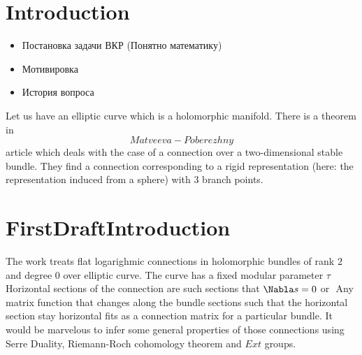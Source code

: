 \documentclass[11pt]{article}
\begin{document}
    \section{Introduction}\label{sec:introduction}
        \begin{itemize}
            \item Постановка задачи ВКР (Понятно математику)
            \item Мотивировка
            \item История вопроса
        \end{itemize}

        Let us have an elliptic curve which is a holomorphic manifold.
    There is a theorem in \[Matveeva-Poberezhny\] article which deals
    with the case of a connection over a two-dimensional stable bundle.
    They find a connection corresponding to a rigid representation
    (here: the representation induced from a sphere) with $3$ branch points.



    \section{FirstDraftIntroduction}\label{sec:firstdraftintroduction}
    The work treats flat logarighmic connections
    in holomorphic bundles of rank $2$ and degree $0$ over elliptic curve.
    The curve has a fixed modular parameter $\tau$
%
    Horizontal sections of the connection are such sections that
    $\Nabla s = 0$ or $ $
    Any matrix function that changes along the bundle sections
    such that the horizontal section stay horizontal fits as a
    connection matrix for a particular bundle.
    It would be marvelous to infer some general properties
    of those connections
    using Serre Duality, Riemann-Roch cohomology theorem
    and $Ext$ groups.
\end{document}
